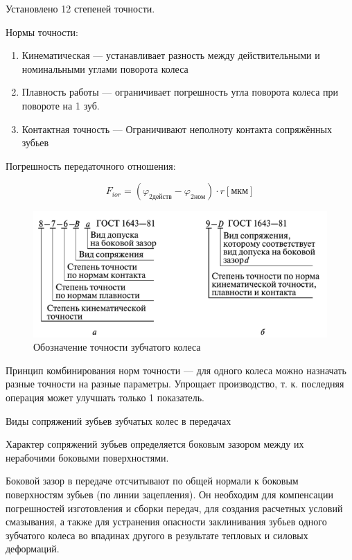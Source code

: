 Установлено 12 степеней точности.

Нормы точности:

\begin{enumerate}
	\item Кинематическая --- устанавливает разность между действительными и номинальными углами поворота колеса
	\item Плавность работы --- ограничивает погрешность угла поворота колеса при повороте на 1 зуб.
	\item Контактная точность --- Ограничивают неполноту контакта сопряжённых зубьев
\end{enumerate}

Погрешность передаточного отношения:

\[ F_{ior} = (\varphi_{2 действ} - \varphi_{2 ном}) \cdot r [мкм] \]

\begin{figure}
	\centering
	\includegraphics[width=0.7\linewidth]{pic/408}
	\caption{Обозначение точности зубчатого колеса}
	\label{fig:408}
\end{figure}

Принцип комбинирования норм точности --- для одного колеса можно назначать разные точности на разные параметры. Упрощает производство, т. к. последняя операция может улучшать только 1 показатель.

Виды сопряжений зубьев зубчатых колес в передачах

Характер сопряжений зубьев определяется боковым зазором между их нерабочими боковыми поверхностями.

Боковой зазор в передаче отсчитывают по общей нормали к боковым поверхностям зубьев (по линии зацепления). Он необходим для компенсации погрешностей изготовления и сборки передач, для создания расчетных условий смазывания, а также для устранения опасности заклинивания зубьев одного зубчатого колеса во впадинах другого в результате тепловых и силовых деформаций.

